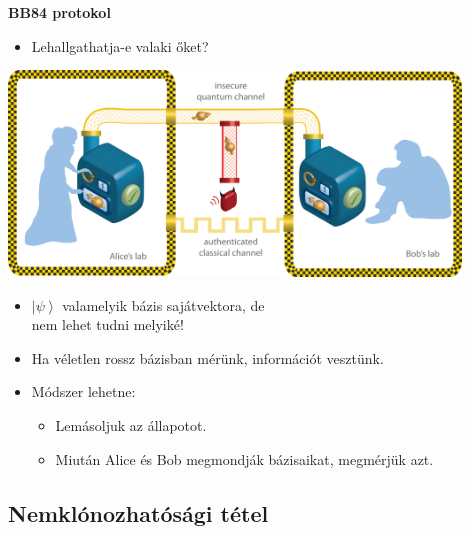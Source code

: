 \documentclass{beamer}
\begin{document}
    \begin{frame}

        \center

        \textbf{BB84 protokol}

        \begin{itemize}
            \item Lehallgathatja-e valaki őket?
        \end{itemize}

        \includegraphics[trim={40px 80px 40px 25px},clip,width=0.9\textwidth]{quantum_alice_and_bob.jpg}
        \begin{itemize}
            \item $\left| \psi \right\rangle$ valamelyik bázis sajátvektora, de\\
                nem lehet tudni melyiké!
            \item Ha véletlen rossz bázisban mérünk, információt vesztünk.
            \item Módszer lehetne:
                \begin{itemize}
                    \item Lemásoljuk az állapotot.
                    \item Miután Alice és Bob megmondják bázisaikat, megmérjük azt.
                \end{itemize}
        \end{itemize}

    \end{frame}

    \subsection{Nemklónozhatósági tétel}
\end{document}
